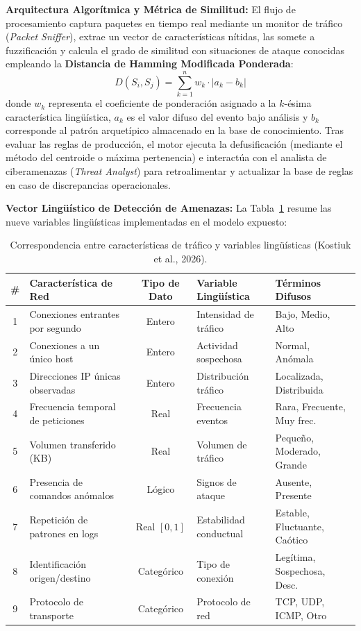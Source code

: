 \documentclass[12pt,a4paper]{article}
\begin{document}
\textbf{Arquitectura Algorítmica y Métrica de Similitud:}
El flujo de procesamiento captura paquetes en tiempo real mediante un monitor de tráfico (\textit{Packet Sniffer}), extrae un vector de características nítidas, las somete a fuzzificación y calcula el grado de similitud con situaciones de ataque conocidas empleando la \textbf{Distancia de Hamming Modificada Ponderada}:
\begin{equation}
    D(S_i, S_j) = \sum_{k=1}^n w_k \cdot \left| a_k - b_k \right|
\end{equation}
donde $w_k$ representa el coeficiente de ponderación asignado a la $k$-ésima característica lingüística, $a_k$ es el valor difuso del evento bajo análisis y $b_k$ corresponde al patrón arquetípico almacenado en la base de conocimiento. Tras evaluar las reglas de producción, el motor ejecuta la defusificación (mediante el método del centroide o máxima pertenencia) e interactúa con el analista de ciberamenazas (\textit{Threat Analyst}) para retroalimentar y actualizar la base de reglas en caso de discrepancias operacionales.

\textbf{Vector Lingüístico de Detección de Amenazas:}
La Tabla~\ref{tab:variables_caso3} resume las nueve variables lingüísticas implementadas en el modelo expuesto:

\begin{table}[H]
\centering
\caption{Correspondencia entre características de tráfico y variables lingüísticas (Kostiuk et al., 2026).}
\label{tab:variables_caso3}
\small
\renewcommand{\arraystretch}{1.2}
\begin{tabularx}{\textwidth}{c p{4.2cm} c p{2.8cm} p{2.4cm}}
\toprule
\textbf{\#} & \textbf{Característica de Red} & \textbf{Tipo de Dato} & \textbf{Variable Lingüística} & \textbf{Términos Difusos} \\
\midrule
1 & Conexiones entrantes por segundo & Entero & Intensidad de tráfico & Bajo, Medio, Alto \\
2 & Conexiones a un único host & Entero & Actividad sospechosa & Normal, Anómala \\
3 & Direcciones IP únicas observadas & Entero & Distribución tráfico & Localizada, Distribuida \\
4 & Frecuencia temporal de peticiones & Real & Frecuencia eventos & Rara, Frecuente, Muy frec. \\
5 & Volumen transferido (KB) & Real & Volumen de tráfico & Pequeño, Moderado, Grande \\
6 & Presencia de comandos anómalos & Lógico & Signos de ataque & Ausente, Presente \\
7 & Repetición de patrones en logs & Real $[0,1]$ & Estabilidad conductual & Estable, Fluctuante, Caótico \\
8 & Identificación origen/destino & Categórico & Tipo de conexión & Legítima, Sospechosa, Desc. \\
9 & Protocolo de transporte & Categórico & Protocolo de red & TCP, UDP, ICMP, Otro \\
\bottomrule
\end{tabularx}
\end{table}
\end{document}
